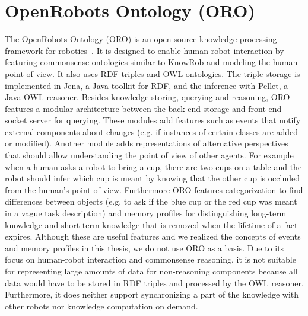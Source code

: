 \section{OpenRobots Ontology (ORO)}
\label{sec:oro}
The OpenRobots Ontology (ORO) is an open source knowledge processing
framework for robotics~\cite{Oro}. It is designed to enable
human-robot interaction by featuring commonsense ontologies similar to
KnowRob and modeling the human point of view. It also uses RDF triples
and OWL ontologies.  The triple storage is implemented in Jena, a Java
toolkit for RDF, and the inference with Pellet, a Java OWL
reasoner. Besides knowledge storing, querying and reasoning, ORO
features a modular architecture between the back-end storage and front
end socket server for querying. These modules add features such as
events that notify external components about changes (e.g. if
instances of certain classes are added or modified).
Another module adds representations of alternative perspectives that
should allow understanding the point of view of other agents.
For example when a human asks a robot to bring a
cup, there are two cups on a table and the robot should infer which
cup is meant by knowing that the other cup is occluded from the human's
point of view. Furthermore ORO features categorization to find
differences between objects (e.g. to ask if the blue cup or the red
cup was meant in a vague task description) and memory profiles for
distinguishing long-term knowledge and short-term knowledge that is
removed when the lifetime of a fact expires. Although these are useful
features and we realized the concepts of events and memory
profiles in this thesis, we do not use ORO as a basis. Due to its
focus on human-robot interaction and commonsense reasoning, it is not
suitable for representing large amounts of data for non-reasoning
components because all data would have to be stored in RDF triples and
processed by the OWL reasoner. Furthermore, it does neither support
synchronizing a part of the knowledge with other robots nor knowledge
computation on demand.

